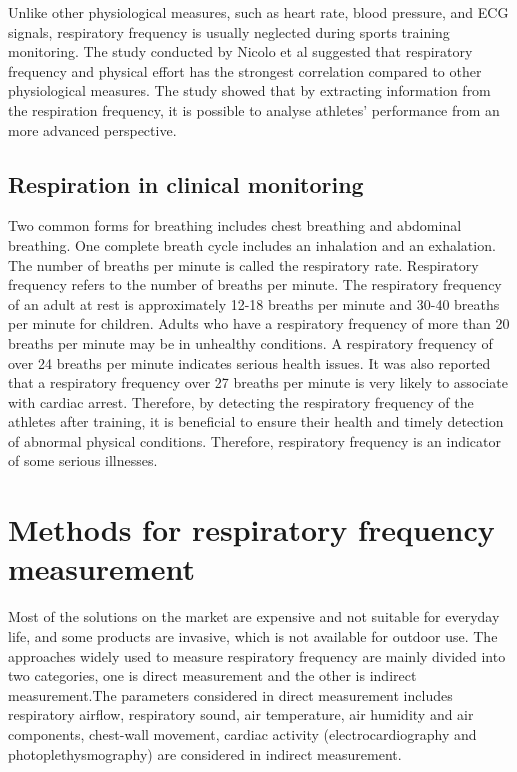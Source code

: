 Unlike other physiological measures, such as heart rate, blood pressure, and ECG signals, respiratory frequency is usually neglected during sports training monitoring. The study conducted by Nicolo et al suggested that respiratory frequency and physical effort has the strongest correlation compared to other physiological measures.\cite{Nicolo2017RespiratoryMeasure} The study showed that by extracting information from the respiration frequency, it is possible to analyse athletes' performance from an more advanced perspective.


\subsection{Respiration in clinical monitoring}

Two common forms for breathing includes chest breathing and abdominal breathing. One complete breath cycle includes an inhalation and an exhalation. The number of breaths per minute is called the respiratory rate. Respiratory frequency refers to the number of breaths per minute. The respiratory frequency of an adult at rest is approximately 12-18 breaths per minute and 30-40 breaths per minute for children. Adults who have a respiratory frequency of more than 20 breaths per minute may be in unhealthy conditions. A respiratory frequency of over 24 breaths per minute indicates serious health issues. It was also reported that a respiratory frequency over 27 breaths per minute is very likely to associate with cardiac arrest.\cite{Cretikos2008OfMBA} Therefore, by detecting the respiratory frequency of the athletes after training, it is beneficial to ensure their health and timely detection of abnormal physical conditions. Therefore, respiratory frequency is an indicator of some serious illnesses.

\section{Methods for respiratory frequency measurement}
Most of the solutions on the market are expensive and not suitable for everyday life, and some products are invasive, which is not available for outdoor use. The approaches widely used to measure respiratory frequency are mainly divided into two categories, one is direct measurement and the other is indirect measurement.The parameters considered in direct measurement includes respiratory airflow, respiratory sound, air temperature, air humidity and air components, chest-wall movement, cardiac activity (electrocardiography and photoplethysmography) are considered in indirect measurement. 
\cite{Massaroni2019Contact-BasedRate} 

